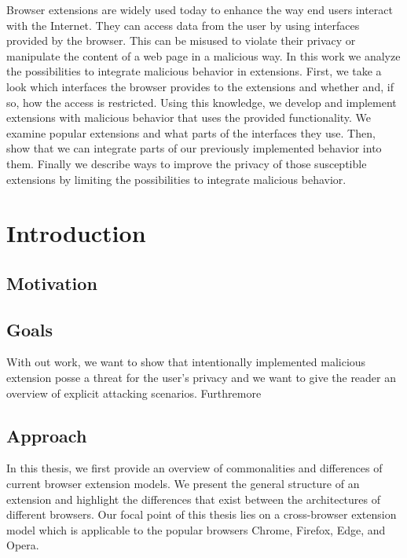 

Browser extensions are widely used today to enhance the way end users interact with the Internet. They can access data from the user by using interfaces provided by the browser. This can be misused to violate their privacy or manipulate the content of a web page in a malicious way. In this work we analyze the possibilities to integrate malicious behavior in extensions. First, we take a look which interfaces the browser provides to the extensions and whether and, if so, how the access is restricted. Using this knowledge, we develop and implement extensions with malicious behavior that uses the provided functionality. We examine popular extensions and what parts of the interfaces they use. Then, show that we can integrate parts of our previously implemented behavior into them. Finally we describe ways to improve the privacy of those susceptible extensions by limiting the possibilities to integrate malicious behavior.

\chapter{Introduction}

\section{Motivation}
	
\section{Goals}
	With out work, we want to show that intentionally implemented malicious extension posse a threat for the user's privacy and we want to give the reader an overview of explicit attacking scenarios. Furthremore

\section{Approach}
	
	In this thesis, we first provide an overview of commonalities and differences of current browser extension models. We present the general structure of an extension and highlight the differences that exist between the architectures of different browsers. Our focal point of this thesis lies on a cross-browser extension model which is applicable to the popular browsers Chrome, Firefox, Edge, and Opera. 
	
